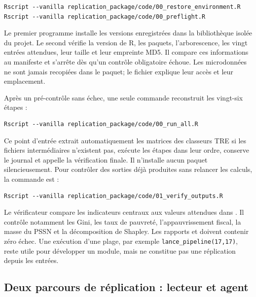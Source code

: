\documentclass[11pt,a4paper]{article}
\begin{document}
\begin{verbatim}
Rscript --vanilla replication_package/code/00_restore_environment.R
Rscript --vanilla replication_package/code/00_preflight.R
\end{verbatim}

Le premier programme installe les versions enregistrées dans la bibliothèque
isolée du projet. Le second vérifie la version de R, les paquets, l'arborescence,
les vingt entrées attendues, leur taille et leur empreinte MD5. Il compare ces
informations au manifeste  et
s'arrête dès qu'un contrôle obligatoire échoue. Les microdonnées ne sont jamais
recopiées dans le paquet; le fichier
 explique leur accès et
leur emplacement.

Après un pré-contrôle sans échec, une seule commande reconstruit les vingt-six
étapes :

\begin{verbatim}
Rscript --vanilla replication_package/code/00_run_all.R
\end{verbatim}

Ce point d'entrée extrait automatiquement les matrices des classeurs TRE si les
fichiers intermédiaires n'existent pas, exécute les étapes dans leur ordre,
conserve le journal et appelle la vérification finale. Il n'installe aucun paquet
silencieusement. Pour contrôler des sorties déjà produites sans relancer les
calculs, la commande est :

\begin{verbatim}
Rscript --vanilla replication_package/code/01_verify_outputs.R
\end{verbatim}

Le vérificateur compare les indicateurs centraux aux valeurs attendues dans
. Il contrôle notamment
les Gini, les taux de pauvreté, l'appauvrissement fiscal, la masse du PSSN et la
décomposition de Shapley. Les rapports
 et  doivent contenir
zéro échec. Une exécution d'une plage, par exemple
\texttt{lance\_pipeline(17,17)}, reste utile pour développer un module, mais ne
constitue pas une réplication depuis les entrées.

\subsection{Deux parcours de réplication : lecteur et agent}
\end{document}
